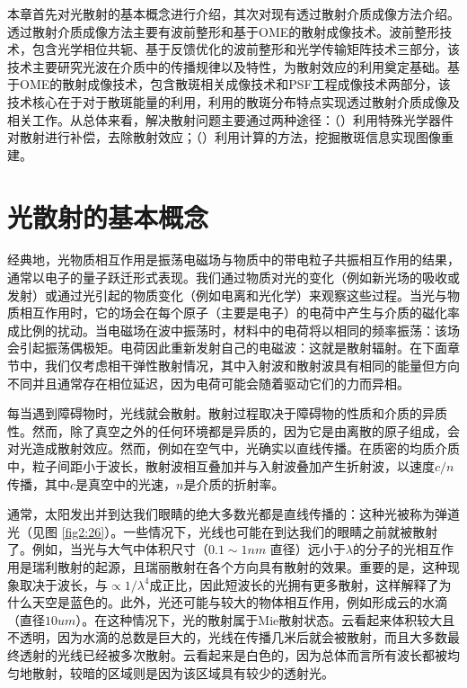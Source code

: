 本章首先对光散射的基本概念进行介绍，其次对现有透过散射介质成像方法介绍\cite{ZhuLei2020}。
透过散射介质成像方法主要有波前整形和基于OME的散射成像技术。波前整形技术，包含光学相位共轭、基于反馈优化的波前整形和光学传输矩阵技术三部分，该技术主要研究光波在介质中的传播规律以及特性，为散射效应的利用奠定基础。基于OME的散射成像技术，包含散斑相关成像技术和PSF工程成像技术两部分，该技术核心在于对于散斑能量的利用，利用的散斑分布特点实现透过散射介质成像及相关工作。从总体来看，解决散射问题主要通过两种途径：（）利用特殊光学器件对散射进行补偿，去除散射效应；（）利用计算的方法，挖掘散斑信息实现图像重建。


\section{光散射的基本概念}

经典地，光物质相互作用是振荡电磁场与物质中的带电粒子共振相互作用的结果，通常以电子的量子跃迁形式表现。我们通过物质对光的变化（例如新光场的吸收或发射）或通过光引起的物质变化（例如电离和光化学）来观察这些过程。当光与物质相互作用时，它的场会在每个原子（主要是电子）的电荷中产生与介质的磁化率成比例的扰动。当电磁场在波中振荡时，材料中的电荷将以相同的频率振荡：该场会引起振荡偶极矩。电荷因此重新发射自己的电磁波：这就是散射辐射。在下面章节中，我们仅考虑相干弹性散射情况，其中入射波和散射波具有相同的能量但方向不同并且通常存在相位延迟，因为电荷可能会随着驱动它们的力而异相。

每当遇到障碍物时，光线就会散射。散射过程取决于障碍物的性质和介质的异质性。然而，除了真空之外的任何环境都是异质的，因为它是由离散的原子组成，会对光造成散射效应。然而，例如在空气中，光确实以直线传播。在质密的均质介质中，粒子间距小于波长，散射波相互叠加并与入射波叠加产生折射波，以速度$c/n$传播，其中$c$是真空中的光速，$n$是介质的折射率\cite{bohren_absorption_2008}。

通常，太阳发出并到达我们眼睛的绝大多数光都是直线传播的：这种光被称为弹道光（见图 \ref{fig2:26}）。一些情况下，光线也可能在到达我们的眼睛之前就被散射了。例如，当光与大气中体积尺寸（$0.1 \sim 1 nm$ 直径）远小于$\lambda$的分子的光相互作用是瑞利散射的起源，且瑞丽散射在各个方向具有散射的效果。重要的是，这种现象取决于波长，与$\propto 1/ \lambda^4$成正比，因此短波长的光拥有更多散射，这样解释了为什么天空是蓝色的。此外，光还可能与较大的物体相互作用，例如形成云的水滴（直径$10 um$）。在这种情况下，光的散射属于Mie散射状态\cite{noauthor_mie_2022}。云看起来体积较大且不透明，因为水滴的总数是巨大的，光线在传播几米后就会被散射，而且大多数最终透射的光线已经被多次散射。云看起来是白色的，因为总体而言所有波长都被均匀地散射，较暗的区域则是因为该区域具有较少的透射光。

